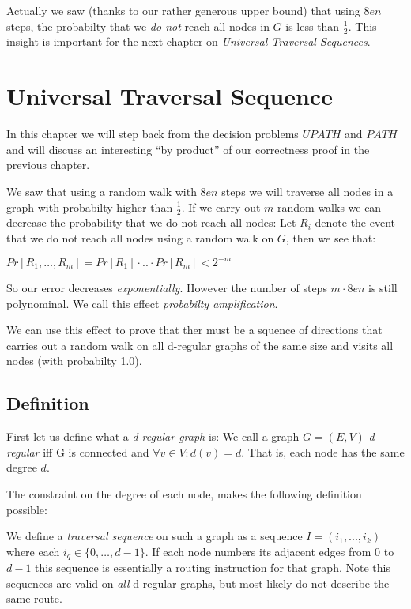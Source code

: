 Actually we saw (thanks to our rather generous upper bound) that using
$8en$ steps, the probabilty that we \emph{do not} reach all nodes in $G$
is less than $\frac{1}{2}$. This insight is important for the next
chapter on \emph{Universal Traversal Sequences}.

\chapter{Universal Traversal
Sequence}\label{universal-traversal-sequence}

In this chapter we will step back from the decision problems $UPATH$ and
$PATH$ and will discuss an interesting ``by product'' of our correctness
proof in the previous chapter.

We saw that using a random walk with $8en$ steps we will traverse all
nodes in a graph with probabilty higher than $\frac{1}{2}$. If we carry
out $m$ random walks we can decrease the probability that we do not
reach all nodes: Let $R_i$ denote the event that we do not reach all
nodes using a random walk on $G$, then we see that:

$Pr[R_1, \dots, R_m] = Pr[R_1] \cdot .. \cdot Pr[R_m] < 2^{-m}$

So our error decreases \emph{exponentially}. However the number of steps
$m \cdot 8en$ is still polynominal. We call this effect \emph{probabilty
amplification}.

We can use this effect to prove that ther must be a squence of
directions that carries out a random walk on all d-regular graphs of the
same size and visits all nodes (with probabilty 1.0).

\section{Definition}\label{definition}

First let us define what a \emph{d-regular graph} is: We call a graph
$G = (E, V)$ \emph{d-regular} iff G is connected and
$\forall v \in V: d(v) = d$. That is, each node has the same degree $d$.

The constraint on the degree of each node, makes the following
definition possible:

We define a \emph{traversal sequence} on such a graph as a sequence
$I = (i_1, ..., i_k)$ where each $i_q \in \{0, \dots, d-1\}$. If each
node numbers its adjacent edges from $0$ to $d-1$ this sequence is
essentially a routing instruction for that graph. Note this sequences
are valid on \emph{all} d-regular graphs, but most likely do not
describe the same route.

